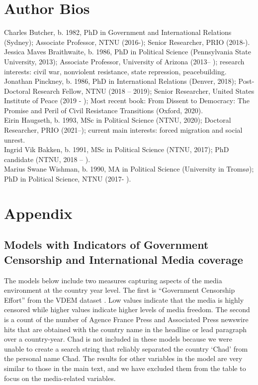 \section{Author Bios}

Charles Butcher, b. 1982, PhD in Government and International Relations
(Sydney); Associate Professor, NTNU (2016-); Senior Researcher, PRIO (2018-). \\

Jessica Maves Braithwaite, b. 1986, PhD in Political Science (Pennsylvania State
University, 2013); Associate Professor, University of Arizona (2013– ); research
interests: civil war, nonviolent resistance, state repression, peacebuilding.\\

Jonathan Pinckney, b. 1986, PhD in International Relations (Denver, 2018);
Post-Doctoral Research Fellow, NTNU (2018 – 2019); Senior Researcher, United
States Institute of Peace (2019 - ); Most recent book: From Dissent to
Democracy: The Promise and Peril of Civil Resistance Transitions (Oxford,
2020).\\

Eirin Haugseth, b. 1993, MSc in Political Science (NTNU, 2020); Doctoral
Researcher, PRIO (2021–); current main interests: forced migration and social
unrest.\\

Ingrid Vik Bakken, b. 1991, MSc in Political Science (NTNU, 2017); PhD candidate
(NTNU, 2018 -- ).\\

Marius Swane Wishman, b. 1990, MA in Political Science (University in Tromsø);
PhD in Political Science, NTNU (2017- ).\\


\clearpage




\clearpage

\section{Appendix}

\subsection{Models with Indicators of Government Censorship and International Media coverage}

The models below include two measures capturing aspects of the media environment
at the country year level. The first is ``Government Censorship Effort'' from
the VDEM dataset \citep{Coppedge2019}. Low values indicate that the media is
highly censored while higher values indicate higher levels of media freedom. The
second is a count of the number of Agence France Press and Associated Press
newswire hits that are obtained with the country name in the headline or lead
paragraph over a country-year. Chad is not included in these models because we
were unable to create a search string that reliably separated the country `Chad'
from the personal name Chad. The results for other variables in the model are
very similar to those in the main text, and we have excluded them from the table
to focus on the media-related variables. 

